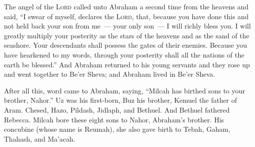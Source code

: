 \begin{inparaenum}
     The angel of the \textsc{Lord} called unto Abraham a second time from the heavens%
     and said, ``I swear of myself, declares the \textsc{Lord}, that, because you have done this and not held back your son from me\understood~--- your only son~---%
     I will richly bless you. I will greatly multiply your posterity as the stars of the heavens and as the sand of the seashore. Your descendants shall possess the gates of their enemies.%
     Because you have hearkened to my words, through your posterity shall all the nations of the earth be blessed.''%
     And Abraham returned to his young servants and they rose up and went together to Be'er Sheva; and Abraham lived in Be'er Sheva.%
    
     After all this, word came to Abraham, saying, ``Milcah has birthed sons to your brother, Nahor.''%
     Uz was his first-born, Buz his brother, Kemuel the father of Aram.%
     Chesed, Hazo, Pildash, Jidlaph, and Bethuel.%
     And Bethuel fathered Rebecca. Milcah bore these eight sons to Nahor, Abraham's brother.%
     His concubine (whose name is Reumah), she also gave birth to Tebah, Gaham, Thahash, and Ma'acah.%
\end{inparaenum}
